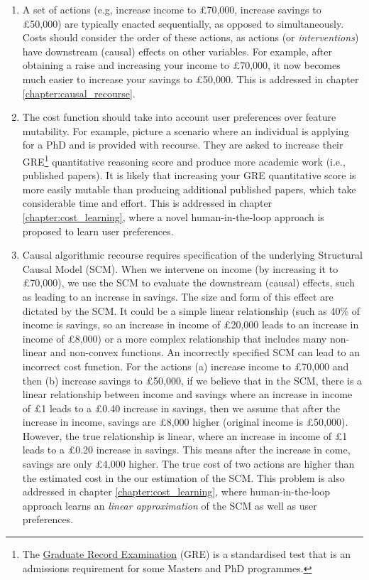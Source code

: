 \begin{enumerate}
	\item A set of actions (e.g, increase income to £70,000, increase savings to £50,000) are typically enacted sequentially, as opposed to simultaneously. Costs should consider the order of these actions, as actions (or \textit{interventions}) have downstream (causal) effects on other variables. For example, after obtaining a raise and increasing your income to £70,000, it now becomes much easier to increase your savings to £50,000. This is addressed in chapter \ref{chapter:causal_recourse}.
	
	\item The cost function should take into account user preferences over feature mutability. For example, picture a scenario where an individual is applying for a PhD and is provided with recourse. They are asked to increase their GRE\footnote{The \href{https://www.ets.org/gre.html}{Graduate Record Examination} (GRE) is a standardised test that is an admissions requirement for some Masters and PhD programmes.} quantitative reasoning score and produce more academic work (i.e., published papers). It is likely that increasing your GRE quantitative score is more easily mutable than producing additional published papers, which take considerable time and effort. This is addressed in chapter \ref{chapter:cost_learning}, where a novel human-in-the-loop approach is proposed to learn user preferences.
	
	\item Causal algorithmic recourse requires specification of the underlying Structural Causal Model (SCM). When we intervene on income (by increasing it to £70,000), we use the SCM to evaluate the downstream (causal) effects, such as leading to an increase in savings. The size and form of this effect are dictated by the SCM. It could be a simple linear relationship (such as 40\% of income is savings, so an increase in income of £20,000 leads to an increase in income of £8,000) or a more complex relationship that includes many non-linear and non-convex functions. An incorrectly specified SCM can lead to an incorrect cost function. For the actions (a) increase income to £70,000 and then (b) increase savings to £50,000, if we believe that in the SCM, there is a linear relationship between income and savings where an increase in income of £1 leads to a £0.40 increase in savings, then we assume that after the increase in income, savings are £8,000 higher (original income is £50,000). However, the true relationship is linear, where an increase in income of £1 leads to a £0.20 increase in savings. This means after the increase in come, savings are only £4,000 higher. The true cost of two actions are higher than the estimated cost in the our estimation of the SCM. This problem is also addressed in chapter \ref{chapter:cost_learning}, where human-in-the-loop approach learns an \textit{linear approximation} of the SCM as well as user preferences.
	
	
\end{enumerate}


